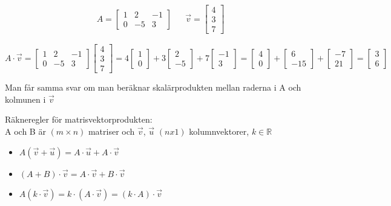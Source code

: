 \begin{Ex}
    \begin{align*}
    &A = \begin{bmatrix} 1&2&-1\\0&-5&3 \end{bmatrix} &&\vec{v} = \begin{bmatrix} 4\\3\\7 \end{bmatrix}
    \end{align*}

    \[
        A \cdot \vec{v} = \begin{bmatrix} 1&2&-1\\0&-5&3 \end{bmatrix} \begin{bmatrix} 4\\3\\7 \end{bmatrix} = 4 \begin{bmatrix} 1\\0 \end{bmatrix} + 3 \begin{bmatrix} 2\\-5 \end{bmatrix} + 7 \begin{bmatrix} -1\\3 \end{bmatrix} = \begin{bmatrix} 4\\0 \end{bmatrix} + \begin{bmatrix} 6\\-15 \end{bmatrix} + \begin{bmatrix} -7\\21 \end{bmatrix} = \begin{bmatrix} 3\\6 \end{bmatrix}
    \]
\end{Ex}
\begin{Rem}
    Man får samma svar om man beräknar skalärprodukten mellan raderna i A och kolmunen i $\vec{v}$
\end{Rem}
Räkneregler för matrisvektorprodukten:\\
A och B är $(m \times n)$ matriser och $\vec{v}$, $\vec{u}$ $(nx1)$ kolumnvektorer, $k \in \mathbb{R}$
\begin{itemize}
	\item $A(\vec{v} + \vec{u}) = A \cdot \vec{u} + A \cdot \vec{v}$
	\item $(A + B) \cdot \vec{v} = A \cdot \vec{v} + B \cdot \vec{v}$
	\item $A(k \cdot \vec{v}) = k \cdot (A \cdot \vec{v}) = (k \cdot A) \cdot \vec{v}$
\end{itemize}

